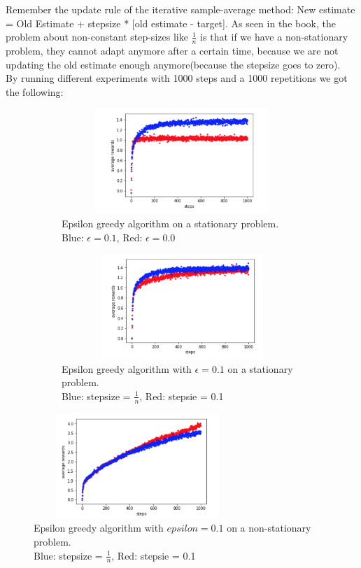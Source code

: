 \documentclass[12pt,a4paper]{article}
\begin{document}
Remember the update rule of the iterative sample-average method: New estimate = Old Estimate + stepsize * [old estimate - target]. As seen in the book, the problem about non-constant step-sizes like $\frac{1}{n}$ is that if we have a non-stationary problem, they cannot adapt anymore after a certain time, because we are not updating the old estimate enough anymore(because the stepsize goes to zero). \\ 
By running different experiments with 1000 steps and a 1000 repetitions we got the following: \\
\begin{figure}[h]
\begin{subfigure}{.5\textwidth}
 \includegraphics[width=1\textwidth, height = 150px]{images/epsilon_greedy_comparison.png}
 \caption{Epsilon greedy algorithm on a stationary problem. \\Blue: $\epsilon = 0.1$, Red: $\epsilon = 0.0$}
\end{subfigure}
\begin{subfigure}{.5\textwidth}
 \includegraphics[width=1\textwidth, height = 150px]{images/stepsize_comparison_stationary.png}
 \caption{Epsilon greedy algorithm with $\epsilon = 0.1$ on a stationary problem.\\ Blue: stepsize = $\frac{1}{n}$, Red: stepsie = 0.1}
 \end{subfigure}

\includegraphics[width=0.7\textwidth, height = 150px]{images/stepsize_comparison_non_stationary.png}
\centering
\caption{Epsilon greedy algorithm with $epsilon = 0.1$ on a non-stationary problem. \\ Blue: stepsize = $\frac{1}{n}$, Red: stepsie = 0.1}
\end{figure}
\end{document}
